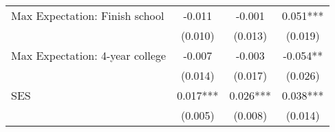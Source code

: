 {\begin{tabular}{lccc}
\hspace{3mm}Max Expectation: Finish school&      -0.011   &      -0.001   &       0.051***\\
                    &     (0.010)   &     (0.013)   &     (0.019)   \\
 
\hspace{3mm}Max Expectation: 4-year college&      -0.007   &      -0.003   &      -0.054** \\
                    &     (0.014)   &     (0.017)   &     (0.026)   \\
 
\hspace{3mm}SES     &       0.017***&       0.026***&       0.038***\\
                    &     (0.005)   &     (0.008)   &     (0.014)   \\
 

\bottomrule
\end{tabular}
}
